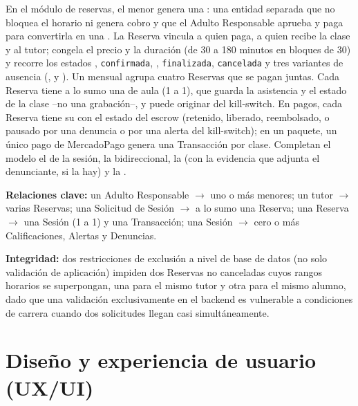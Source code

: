 En el módulo de reservas, el menor genera una :
una entidad separada que no bloquea el horario ni genera cobro y que el
Adulto Responsable aprueba y paga para convertirla en una .
La Reserva vincula a quien paga, a quien recibe la clase y al tutor;
congela el precio y la duración (de 30 a 180 minutos en bloques de 30) y
recorre los estados , \texttt{confirmada},
, \texttt{finalizada}, \texttt{cancelada} y tres
variantes de ausencia (,
 y ). Un 
mensual agrupa cuatro Reservas que se pagan juntas. Cada Reserva tiene
a lo sumo una  de aula (1 a 1), que guarda la asistencia y el
estado de la clase --no una grabación--, y puede originar
 del kill-switch. En pagos, cada Reserva tiene su
 con el estado del \gls{escrow} (retenido, liberado,
reembolsado, o pausado por una denuncia o por una alerta del kill-switch); en un paquete, un único pago de
MercadoPago genera una Transacción por clase. Completan el modelo el
 de la sesión, la  bidireccional, la
 (con la evidencia que adjunta el denunciante, si la hay) y
la .

\textbf{Relaciones clave:} un Adulto Responsable $\rightarrow$ uno o más
menores; un tutor $\rightarrow$ varias Reservas; una Solicitud de Sesión
$\rightarrow$ a lo sumo una Reserva; una Reserva $\rightarrow$ una Sesión
(1 a 1) y una Transacción; una Sesión $\rightarrow$ cero o más
Calificaciones, Alertas y Denuncias.

\textbf{Integridad:} dos restricciones de exclusión a nivel de base de
datos (no solo validación de aplicación) impiden dos Reservas no
canceladas cuyos rangos horarios se superpongan, una para el mismo tutor
y otra para el mismo alumno, dado que una validación exclusivamente en el
backend es vulnerable a condiciones de carrera cuando dos solicitudes
llegan casi simultáneamente.

\section{Diseño y experiencia de usuario (UX/UI)}

